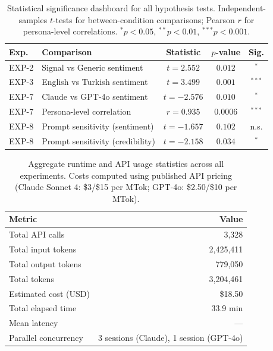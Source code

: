 \begin{table}[H]
\centering
\caption{Statistical significance dashboard for all hypothesis tests.
Independent-samples $t$-tests for between-condition comparisons; Pearson $r$ for
persona-level correlations. $^*p<0.05$, $^{**}p<0.01$, $^{***}p<0.001$.}
\label{tab:significance}
\small
\begin{tabular}{@{}llccc@{}}
\toprule
\textbf{Exp.} & \textbf{Comparison} & \textbf{Statistic} & \textbf{$p$-value} & \textbf{Sig.} \\
\midrule
    EXP-2 & Signal vs Generic sentiment & $t=2.552$ & $0.012$ & $^*$ \\
    EXP-3 & English vs Turkish sentiment & $t=3.499$ & $0.001$ & $^{***}$ \\
    EXP-7 & Claude vs GPT-4o sentiment & $t=-2.576$ & $0.010$ & $^*$ \\
    EXP-7 & Persona-level correlation & $r=0.935$ & $0.0006$ & $^{***}$ \\
    EXP-8 & Prompt sensitivity (sentiment) & $t=-1.657$ & $0.102$ & n.s. \\
    EXP-8 & Prompt sensitivity (credibility) & $t=-2.158$ & $0.034$ & $^*$ \\
\bottomrule
\end{tabular}
\end{table}


\begin{table}[H]
\centering
\caption{Aggregate runtime and API usage statistics across all experiments.
Costs computed using published API pricing (Claude Sonnet 4: \$3/\$15 per MTok;
GPT-4o: \$2.50/\$10 per MTok).}
\label{tab:runtime}
\small
\begin{tabular}{@{}lr@{}}
\toprule
\textbf{Metric} & \textbf{Value} \\
\midrule
Total API calls & 3,328 \\
Total input tokens & 2,425,411 \\
Total output tokens & 779,050 \\
Total tokens & 3,204,461 \\
Estimated cost (USD) & \$18.50 \\
Total elapsed time & 33.9 min \\
Mean latency & --- \\
Parallel concurrency & 3 sessions (Claude), 1 session (GPT-4o) \\
\bottomrule
\end{tabular}
\end{table}